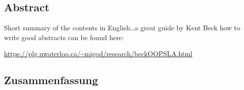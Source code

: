 \begingroup
\let\clearpage\relax
\let\cleardoublepage\relax
\let\cleardoublepage\relax

\begin{otherlanguage}{american}
	\chapter*{Abstract}
	Short summary of the contents in English\dots a great guide by
	Kent Beck how to write good abstracts can be found here:
	\begin{center}
		\url{https://plg.uwaterloo.ca/~migod/research/beckOOPSLA.html}
	\end{center}
\end{otherlanguage}

\newpage
\cleardoublepage

\begin{otherlanguage}{ngerman}
	\chapter*{Zusammenfassung}
\end{otherlanguage}

\endgroup

\vfill
